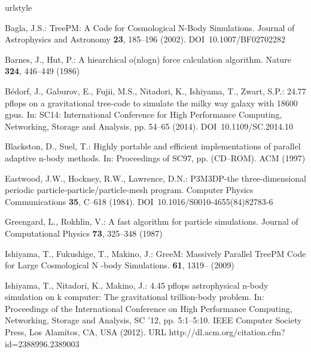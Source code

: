 \newcommand{\noopsort}[1]{} \newcommand{\printfirst}[2]{#1}
  \newcommand{\singleletter}[1]{#1} \newcommand{\switchargs}[2]{#2#1}
\begin{thebibliography}{10}
\providecommand{\url}[1]{{#1}}
\providecommand{\urlprefix}{URL }
\expandafter\ifx\csname urlstyle\endcsname\relax
  \providecommand{\doi}[1]{DOI~\discretionary{}{}{}#1}\else
  \providecommand{\doi}{DOI~\discretionary{}{}{}\begingroup
  \urlstyle{rm}\Url}\fi

{Bagla}, J.S.: {TreePM: A Code for Cosmological N-Body Simulations}.
\newblock Journal of Astrophysics and Astronomy \textbf{23}, 185--196 (2002).
\newblock \doi{10.1007/BF02702282}

{Barnes}, J., {Hut}, P.: A hiearchical o(nlogn) force calculation algorithm.
\newblock Nature \textbf{324}, 446--449 (1986)

B{\'e}dorf, J., Gaburov, E., Fujii, M.S., Nitadori, K., Ishiyama, T., Zwart,
  S.P.: 24.77 pflops on a gravitational tree-code to simulate the milky way
  galaxy with 18600 gpus.
\newblock In: SC14: International Conference for High Performance Computing,
  Networking, Storage and Analysis, pp. 54--65 (2014).
\newblock \doi{10.1109/SC.2014.10}

Blackston, D., Suel, T.: Highly portable and efficient implementations of
  parallel adaptive n-body methods.
\newblock In: Proceedings of SC97, pp. (CD--ROM). ACM (1997)

{Eastwood}, J.W., {Hockney}, R.W., {Lawrence}, D.N.: {P3M3DP-the
  three-dimensional periodic particle-particle/particle-mesh program}.
\newblock Computer Physics Communications \textbf{35}, C--618 (1984).
\newblock \doi{10.1016/S0010-4655(84)82783-6}

Greengard, L., Rokhlin, V.: A fast algorithm for particle simulations.
\newblock Journal of Computational Physics \textbf{73}, 325--348 (1987)

{Ishiyama}, T., {Fukushige}, T., {Makino}, J.: {GreeM: Massively Parallel
  TreePM Code for Large Cosmological N -body Simulations}.
\newblock \pasj \textbf{61}, 1319-- (2009)

Ishiyama, T., Nitadori, K., Makino, J.: 4.45 pflops astrophysical n-body
  simulation on k computer: The gravitational trillion-body problem.
\newblock In: Proceedings of the International Conference on High Performance
  Computing, Networking, Storage and Analysis, SC '12, pp. 5:1--5:10. IEEE
  Computer Society Press, Los Alamitos, CA, USA (2012).
\newblock \urlprefix\url{http://dl.acm.org/citation.cfm?id=2388996.2389003}


\end{thebibliography}
